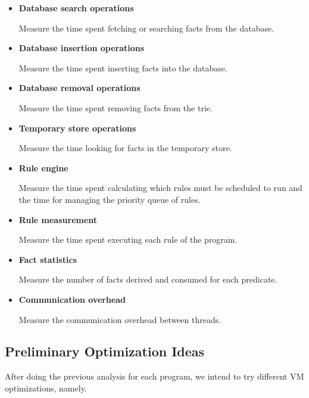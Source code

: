 \begin{itemize}
   \item \textbf{Database search operations}
   
   Measure the time spent fetching or searching facts from the database.
   
   \item \textbf{Database insertion operations}
   
   Measure the time spent inserting facts into the database.
   
   \item \textbf{Database removal operations}
   
   Measure the time spent removing facts from the trie.
   
   \item \textbf{Temporary store operations}
   
   Measure the time looking for facts in the temporary store.
   
   \item \textbf{Rule engine}
   
   Measure the time spent calculating which rules must be scheduled to run and the time for managing the priority queue of rules.
   
   \item \textbf{Rule measurement}
   
   Measure the time spent executing each rule of the program.
   
   \item \textbf{Fact statistics}
   
   Measure the number of facts derived and consumed for each predicate.
   
   \item \textbf{Communication overhead}
   
   Measure the communication overhead between threads.
   
\end{itemize}

\subsection{Preliminary Optimization Ideas}

After doing the previous analysis for each \lang program, we intend to try different VM optimizations, namely.


